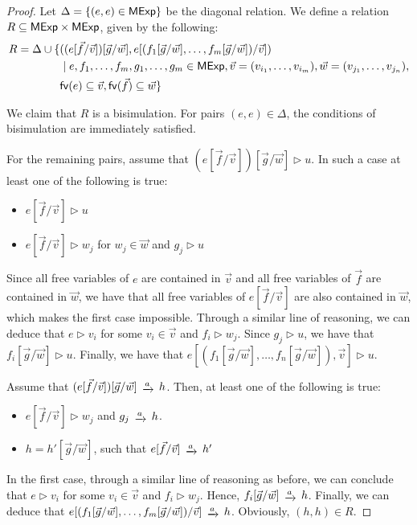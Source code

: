 \begin{proof}
	Let $\Delta = \{(e,e) \in \mathsf{MExp}\}$ be the diagonal relation. We define a relation ${R} \subseteq {\mathsf{MExp}\times \mathsf{MExp}}$, given by the following:
	\begin{align*}
		R = \Delta \cup \{&((e[\vec{f}/ \vec{v}])[\vec{g}/\vec{w}], e [(f_1[\vec{g}/\vec{w}], \dots, f_m[\vec{g}/\vec{w}])/\vec{v}])\\ &\mid e, f_1, \dots, f_m, g_1, \dots, g_m \in \mathsf{MExp}, \vec{v}=(v_{i_1}, \dots, v_{i_m}), \vec{w}=(v_{j_1}, \dots, v_{j_n}),\\ &\mathsf{fv}(e) \subseteq 		\vec{v},  \mathsf{fv}(\vec{f}) \subseteq \vec{w}\}
	\end{align*}

	
	 We claim that $R$ is a bisimulation. For pairs $(e,e) \in \Delta$, the conditions of bisimulation are immediately satisfied. 
	
	For the remaining pairs, assume that $(e[\vec{f}/ \vec{v}])[\vec{g}/\vec{w}] \rhd u$. In such a case at least one of the following is true:
	\begin{itemize}
		\item $e[\vec{f}/ \vec{v}] \rhd u$
		\item $e[\vec{f}/\vec{v}] \rhd w_j$ for $w_j \in \vec{w}$ and $g_j \rhd u$
	\end{itemize}
	Since all free variables of $e$ are contained in $\vec{v}$ and all free variables of $\vec{f}$ are contained in $\vec{w}$, we have that all free variables of $e[\vec{f}/\vec{v}]$ are also contained in $\vec{w}$, which makes the first case impossible. Through a similar line of reasoning, we can deduce that $e \rhd v_i$ for some $v_i \in \vec{v}$ and $f_i \rhd w_j$. Since $g_j \rhd u$, we have that $f_i[\vec{g}/\vec{w}] \rhd u$. Finally, we have that $e[(f_1[\vec{g}/\vec{w}], \dots, f_n[\vec{g}/\vec{w}]), \vec{v}] \rhd u$.
	
	Assume that $(e[\vec{f}/ \vec{v}])[\vec{g}/\vec{w}] \tr{a} h$. Then, at least one of the following is true:
	\begin{itemize}
		\item $e[\vec{f}/\vec{v}] \rhd w_j$ and $g_j \tr{a} h$.
		\item $h = h'[\vec{g}/\vec{w}]$, such that $e[\vec{f}/\vec{v}] \tr{a} h'$ 
	\end{itemize}
	In the first case, through a similar line of reasoning as before, we can conclude that $e \rhd{ v_i}$ for some $v_i \in \vec{v}$ and $f_i \rhd w_j$. Hence, $f_i [\vec{g}/\vec{w}] \tr{a} h $. Finally, we can deduce that $e[(f_1[\vec{g}/\vec{w}], \dots, f_m[\vec{g}/\vec{w}])/\vec{v}] \tr{a} h$. Obviously, $(h,h) \in R$.
	

\end{proof}
